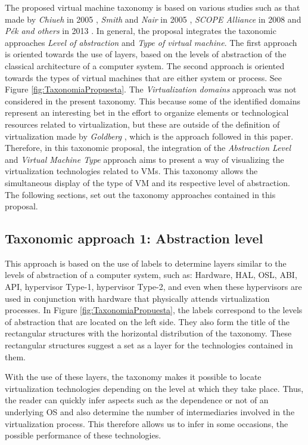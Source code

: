	The proposed virtual machine taxonomy is based on various studies such as that made by \textit{Chiueh} in 2005 \cite{Chiueh2005}, \textit{Smith} and \textit{Nair} in 2005 \cite{Smith2005}, \textit{SCOPE Alliance} in 2008 \cite{SCOPEAlliance2008} and \textit{P{\'e}k and others} in 2013 \cite{Pek2013}. In general, the proposal integrates the taxonomic approaches \textit{Level of abstraction} and \textit{Type of virtual machine}. The first approach is oriented towards the use of layers, based on the levels of abstraction of the classical architecture of a computer system. The second approach is oriented towards the types of virtual machines that are either system or process. See Figure \ref{fig:TaxonomiaPropuesta}. The \textit{Virtualization domains} approach was not considered in the present taxonomy.  This because some of the identified domains represent an interesting bet in the effort to organize elements or technological resources related to virtualization, but these are outside of the definition of virtualization made by \textit{Goldberg} \cite{Goldberg1973}, which is the approach followed in this paper. Therefore, in this taxonomic proposal, the integration of the \textit{Abstraction Level} and \textit{Virtual Machine Type} approach aims to present a way of visualizing the virtualization technologies related to VMs. This taxonomy allows the simultaneous display of the type of VM and its respective level of abstraction. The following sections, set out the taxonomy approaches contained in this proposal.
	
	\subsection{Taxonomic approach 1: Abstraction level}

	This approach is based on the use of labels to determine layers similar to the levels of abstraction of a computer system, such as: Hardware, HAL, OSL, ABI, API, hypervisor Type-1, hypervisor Type-2, and even when these hypervisors are used in conjunction with hardware that physically attends virtualization processes. In Figure \ref{fig:TaxonomiaPropuesta}, the labels correspond to the levels of abstraction that are located on the left side. They also form the title of the rectangular structures with the horizontal distribution of the taxonomy. These rectangular structures suggest a set as a layer for the technologies contained in them.
	
	With the use of these layers, the taxonomy makes it possible to locate virtualization technologies depending on the level at which they take place. Thus, the reader can quickly infer aspects such as the dependence or not of an underlying OS and also determine the number of intermediaries involved in the virtualization process. This therefore allows us to infer in some occasions, the possible performance of these technologies.
	
